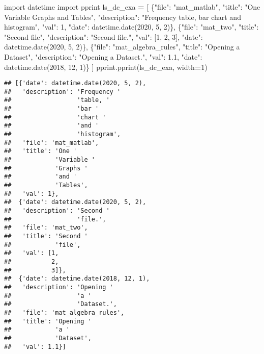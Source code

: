 \documentclass[
]{book}
\newenvironment{Shaded}{\begin{snugshade}}{\end{snugshade}}
\newcommand{\DecValTok}[1]{\textcolor[rgb]{0.00,0.00,0.81}{#1}}
\newcommand{\FloatTok}[1]{\textcolor[rgb]{0.00,0.00,0.81}{#1}}
\newcommand{\ImportTok}[1]{#1}
\newcommand{\NormalTok}[1]{#1}
\newcommand{\OperatorTok}[1]{\textcolor[rgb]{0.81,0.36,0.00}{\textbf{#1}}}
\newcommand{\StringTok}[1]{\textcolor[rgb]{0.31,0.60,0.02}{#1}}
\begin{document}
\begin{Shaded}
\begin{Highlighting}[]
\ImportTok{import}\NormalTok{ datetime}
\ImportTok{import}\NormalTok{ pprint}
\NormalTok{ls_dc_exa }\OperatorTok{=}\NormalTok{  [}
\NormalTok{    \{}\StringTok{"file"}\NormalTok{: }\StringTok{"mat_matlab"}\NormalTok{,}
     \StringTok{"title"}\NormalTok{: }\StringTok{"One Variable Graphs and Tables"}\NormalTok{,}
     \StringTok{"description"}\NormalTok{: }\StringTok{"Frequency table, bar chart and histogram"}\NormalTok{,}
     \StringTok{"val"}\NormalTok{: }\DecValTok{1}\NormalTok{,}
     \StringTok{"date"}\NormalTok{: datetime.date(}\DecValTok{2020}\NormalTok{, }\DecValTok{5}\NormalTok{, }\DecValTok{2}\NormalTok{)\},}
\NormalTok{    \{}\StringTok{"file"}\NormalTok{: }\StringTok{"mat_two"}\NormalTok{,}
     \StringTok{"title"}\NormalTok{: }\StringTok{"Second file"}\NormalTok{,}
     \StringTok{"description"}\NormalTok{: }\StringTok{"Second file."}\NormalTok{,}
     \StringTok{"val"}\NormalTok{: [}\DecValTok{1}\NormalTok{, }\DecValTok{2}\NormalTok{, }\DecValTok{3}\NormalTok{],}
     \StringTok{"date"}\NormalTok{: datetime.date(}\DecValTok{2020}\NormalTok{, }\DecValTok{5}\NormalTok{, }\DecValTok{2}\NormalTok{)\},}
\NormalTok{    \{}\StringTok{"file"}\NormalTok{: }\StringTok{"mat_algebra_rules"}\NormalTok{,}
     \StringTok{"title"}\NormalTok{: }\StringTok{"Opening a Dataset"}\NormalTok{,}
     \StringTok{"description"}\NormalTok{: }\StringTok{"Opening a Dataset."}\NormalTok{,}
     \StringTok{"val"}\NormalTok{: }\FloatTok{1.1}\NormalTok{,}
     \StringTok{"date"}\NormalTok{: datetime.date(}\DecValTok{2018}\NormalTok{, }\DecValTok{12}\NormalTok{, }\DecValTok{1}\NormalTok{)\}}
\NormalTok{]}
\NormalTok{pprint.pprint(ls_dc_exa, width}\OperatorTok{=}\DecValTok{1}\NormalTok{)}
\end{Highlighting}
\end{Shaded}

\begin{verbatim}
## [{'date': datetime.date(2020, 5, 2),
##   'description': 'Frequency '
##                  'table, '
##                  'bar '
##                  'chart '
##                  'and '
##                  'histogram',
##   'file': 'mat_matlab',
##   'title': 'One '
##            'Variable '
##            'Graphs '
##            'and '
##            'Tables',
##   'val': 1},
##  {'date': datetime.date(2020, 5, 2),
##   'description': 'Second '
##                  'file.',
##   'file': 'mat_two',
##   'title': 'Second '
##            'file',
##   'val': [1,
##           2,
##           3]},
##  {'date': datetime.date(2018, 12, 1),
##   'description': 'Opening '
##                  'a '
##                  'Dataset.',
##   'file': 'mat_algebra_rules',
##   'title': 'Opening '
##            'a '
##            'Dataset',
##   'val': 1.1}]
\end{verbatim}
\end{document}
